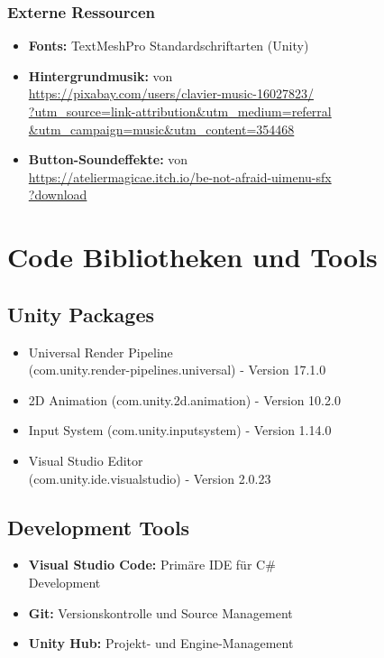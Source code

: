 \subsubsection{Externe Ressourcen}
\begin{itemize}
    \item \textbf{Fonts:} TextMeshPro Standardschriftarten (Unity)
    \item \textbf{Hintergrundmusik:} von \\
          \url{https://pixabay.com/users/clavier-music-16027823/}\\
          \url{?utm_source=link-attribution&utm_medium=referral}\\
          \url{&utm_campaign=music&utm_content=354468}
    \item \textbf{Button-Soundeffekte:} von \\
          \url{https://ateliermagicae.itch.io/be-not-afraid-uimenu-sfx}\\
          \url{?download}
\end{itemize}

\section{Code Bibliotheken und Tools}

\subsection{Unity Packages}
\begin{itemize}
    \item Universal Render Pipeline \\
          (com.unity.render-pipelines.universal) - Version 17.1.0
    \item 2D Animation (com.unity.2d.animation) - Version 10.2.0  
    \item Input System (com.unity.inputsystem) - Version 1.14.0
    \item Visual Studio Editor \\
          (com.unity.ide.visualstudio) - Version 2.0.23
\end{itemize}

\subsection{Development Tools}
\begin{itemize}
    \item \textbf{Visual Studio Code:} Primäre IDE für C\# \\
          Development
    \item \textbf{Git:} Versionskontrolle und Source Management
    \item \textbf{Unity Hub:} Projekt- und Engine-Management
\end{itemize}

